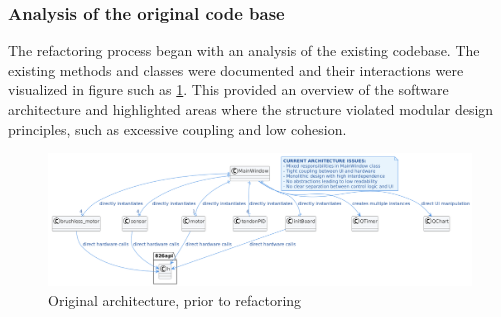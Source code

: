\subsubsection{Analysis of the original code base}
The refactoring process began with an analysis of the existing codebase. The existing methods and classes were documented and their interactions were visualized in figure such as \ref{fig:oldarchitecture}. This provided an overview of the software architecture and highlighted areas where the structure violated modular design principles, such as excessive coupling and low cohesion. 
\begin{figure} [H]
    \centering
    \includegraphics[width=1.1\linewidth]{images/Software documentation/old code/architecture2.png}
    \caption{Original architecture, prior to refactoring}
    \label{fig:oldarchitecture}
\end{figure}

